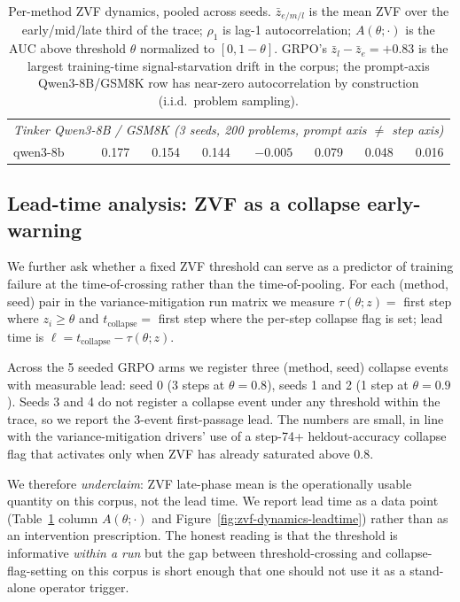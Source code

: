 \begin{table}[htbp]
\begin{tabular}{lrrrrrrr}
\midrule
\multicolumn{8}{l}{\emph{Tinker Qwen3-8B / GSM8K (3 seeds, 200 problems, prompt axis $\neq$ step axis)}}\\
qwen3-8b  & 0.177 & 0.154 & 0.144 & $-0.005$ & 0.079 & 0.048 & 0.016 \\
\bottomrule
\end{tabular}
\caption{Per-method ZVF dynamics, pooled across seeds. $\bar z_{e/m/l}$ is
the mean ZVF over the early/mid/late third of the trace; $\rho_1$ is lag-1
autocorrelation; $A(\theta;\cdot)$ is the AUC above threshold $\theta$
normalized to $[0,1-\theta]$. GRPO's $\bar z_l - \bar z_e = +0.83$ is the
largest training-time signal-starvation drift in the corpus; the
prompt-axis Qwen3-8B/GSM8K row has near-zero autocorrelation by
construction (i.i.d.\ problem sampling).}
\label{tab:zvf-dynamics-pool}
\end{table}

\subsection{Lead-time analysis: ZVF as a collapse early-warning}

We further ask whether a fixed ZVF threshold can serve as a
predictor of training failure at the time-of-crossing rather than
the time-of-pooling. For each (method, seed) pair in the
variance-mitigation run matrix we measure
$\tau(\theta; z) = $ first step where $z_i \ge \theta$ and
$t_{\text{collapse}} = $ first step where the per-step collapse flag
is set; lead time is $\ell = t_{\text{collapse}} - \tau(\theta; z)$.

Across the 5 seeded GRPO arms we register three (method, seed)
collapse events with measurable lead: seed 0 (3 steps at $\theta=0.8$),
seeds 1 and 2 (1 step at $\theta=0.9$). Seeds 3 and 4 do not register
a collapse event under any threshold within the trace, so we report
the 3-event first-passage lead. The numbers are small, in line with
the variance-mitigation drivers' use of a step-74+ heldout-accuracy
collapse flag that activates only when ZVF has already saturated
above 0.8.

We therefore \emph{underclaim}: ZVF late-phase mean is the
operationally usable quantity on this corpus, not the lead time. We
report lead time as a data point (Table~\ref{tab:zvf-dynamics-pool}
column $A(\theta;\cdot)$ and Figure~\ref{fig:zvf-dynamics-leadtime})
rather than as an intervention prescription. The honest reading is
that the threshold is informative \emph{within a run} but the
gap between threshold-crossing and collapse-flag-setting on this
corpus is short enough that one should not use it as a stand-alone
operator trigger.

